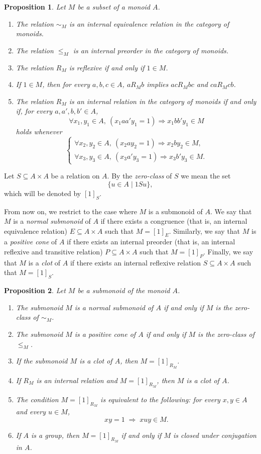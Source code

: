 \documentclass[12pt]{article}
\newtheorem{proposition}{Proposition}
\begin{document}
\begin{proposition}
Let $M$ be a subset of a monoid $A$.
\begin{enumerate}
\item The relation $\sim_{M}$ is an internal equivalence relation in the category of monoids.
\item The relation $\leq_{M}$ is an internal preorder in the category of monoids.
\item The relation $R_{M}$ is reflexive if and only if $1\in M$.
\item If $1\in M$, then for every $a,b,c\in A$, $aR_{M}b$ implies $acR_{M}bc$ and $caR_{M}cb$.
\item The relation $R_M$ is an internal relation in the category of monoids if and only if, for every $a,a',b,b'\in A$,
\[
\forall x_1,y_1\in A,\ (x_1aa'y_1=1)\Rightarrow x_1bb'y_1\in M
\]
holds whenever
\[
\left\lbrace
\begin{array}{l}
\forall x_2,y_2\in A,\ (x_2ay_2=1)\Rightarrow x_2by_2\in M, \\[2pt]
\forall x_3,y_3\in A,\ (x_3a'y_3=1)\Rightarrow x_3b'y_3\in M.
\end{array}
\right.
\]
\end{enumerate}
\end{proposition}

Let $S\subseteq A\times A$ be a relation on $A$. By the \emph{zero-class} of $S$ we mean the set
\[
\{u\in A \mid 1Su\},
\]
which will be denoted by $[1]_S$.

From now on, we restrict to the case where $M$ is a submonoid of $A$. We say that $M$ is a \emph{normal submonoid} of $A$ if there exists a congruence (that is, an internal equivalence relation) $E\subseteq A\times A$ such that $M=[1]_E$. Similarly, we say that $M$ is a \emph{positive cone} of $A$ if there exists an internal preorder (that is, an internal reflexive and transitive relation) $P\subseteq A\times A$ such that $M=[1]_P$. Finally, we say that $M$ is a \emph{clot} of $A$ if there exists an internal reflexive relation $S\subseteq A\times A$ such that $M=[1]_S$.

\begin{proposition}
Let $M$ be a submonoid of the monoid $A$.
\begin{enumerate}
\item The submonoid $M$ is a normal submonoid of $A$ if and only if $M$ is the zero-class of $\sim_{M}$.
\item The submonoid $M$ is a positive cone of $A$ if and only if $M$ is the zero-class of $\leq_{M}$.
\item If the submonoid $M$ is a clot of $A$, then $M=[1]_{R_M}$.
\item If $R_M$ is an internal relation and $M=[1]_{R_M}$, then $M$ is a clot of $A$.
\item The condition $M=[1]_{R_M}$ is equivalent to the following: for every $x,y\in A$ and every $u\in M$,
\[
xy=1 \;\Rightarrow\; xuy \in M.
\]
\item If $A$ is a group, then $M=[1]_{R_M}$ if and only if $M$ is closed under conjugation in $A$.
\end{enumerate}
\end{proposition}
\end{document}
